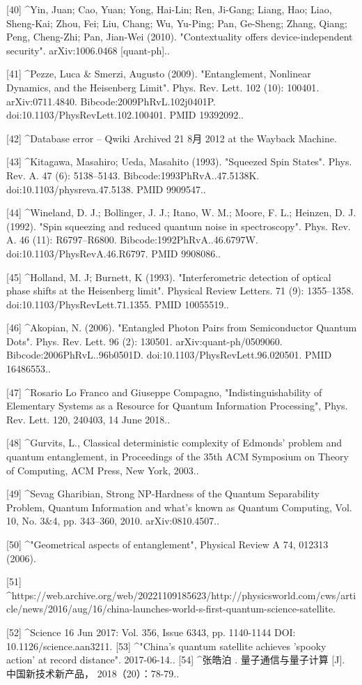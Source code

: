 [40]
^Yin, Juan; Cao, Yuan; Yong, Hai-Lin; Ren, Ji-Gang; Liang, Hao; Liao, Sheng-Kai; Zhou, Fei; Liu, Chang; Wu, Yu-Ping; Pan, Ge-Sheng; Zhang, Qiang; Peng, Cheng-Zhi; Pan, Jian-Wei (2010). "Contextuality offers device-independent security". arXiv:1006.0468 [quant-ph]..

[41]
^Pezze, Luca & Smerzi, Augusto (2009). "Entanglement, Nonlinear Dynamics, and the Heisenberg Limit". Phys. Rev. Lett. 102 (10): 100401. arXiv:0711.4840. Bibcode:2009PhRvL.102j0401P. doi:10.1103/PhysRevLett.102.100401. PMID 19392092..

[42]
^Database error – Qwiki Archived 21 8月 2012 at the Wayback Machine.

[43]
^Kitagawa, Masahiro; Ueda, Masahito (1993). "Squeezed Spin States". Phys. Rev. A. 47 (6): 5138–5143. Bibcode:1993PhRvA..47.5138K. doi:10.1103/physreva.47.5138. PMID 9909547..

[44]
^Wineland, D. J.; Bollinger, J. J.; Itano, W. M.; Moore, F. L.; Heinzen, D. J. (1992). "Spin squeezing and reduced quantum noise in spectroscopy". Phys. Rev. A. 46 (11): R6797–R6800. Bibcode:1992PhRvA..46.6797W. doi:10.1103/PhysRevA.46.R6797. PMID 9908086..

[45]
^Holland, M. J; Burnett, K (1993). "Interferometric detection of optical phase shifts at the Heisenberg limit". Physical Review Letters. 71 (9): 1355–1358. doi:10.1103/PhysRevLett.71.1355. PMID 10055519..

[46]
^Akopian, N. (2006). "Entangled Photon Pairs from Semiconductor Quantum Dots". Phys. Rev. Lett. 96 (2): 130501. arXiv:quant-ph/0509060. Bibcode:2006PhRvL..96b0501D. doi:10.1103/PhysRevLett.96.020501. PMID 16486553..

[47]
^Rosario Lo Franco and Giuseppe Compagno, "Indistinguishability of Elementary Systems as a Resource for Quantum Information Processing", Phys. Rev. Lett. 120, 240403, 14 June 2018..

[48]
^Gurvits, L., Classical deterministic complexity of Edmonds' problem and quantum entanglement, in Proceedings of the 35th ACM Symposium on Theory of Computing, ACM Press, New York, 2003..

[49]
^Sevag Gharibian, Strong NP-Hardness of the Quantum Separability Problem, Quantum Information and what's known as Quantum Computing, Vol. 10, No. 3&4, pp. 343–360, 2010. arXiv:0810.4507..

[50]
^"Geometrical aspects of entanglement", Physical Review A 74, 012313 (2006).

[51]
^https://web.archive.org/web/20221109185623/http://physicsworld.com/cws/article/news/2016/aug/16/china-launches-world-s-first-quantum-science-satellite.

[52]
^Science 16 Jun 2017: Vol. 356, Issue 6343, pp. 1140-1144 DOI: 10.1126/science.aan3211.
[53]
^"China's quantum satellite achieves 'spooky action' at record distance". 2017-06-14..
[54]
^张皓泊 . 量子通信与量子计算 [J]. 中国新技术新产品， 2018（20）：78-79..